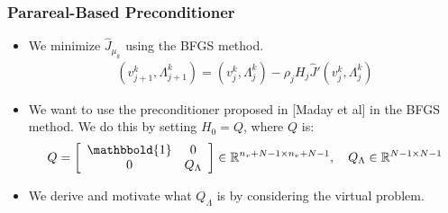 \documentclass[9pt]{beamer}
\begin{document}
\begin{frame}
\frametitle{Parareal-Based Preconditioner}
\begin{itemize}
\item{We minimize $\hat J_{\mu_k}$ using the BFGS method. {\small
\begin{align*}
(v_{j+1}^{k},\Lambda_{j+1}^{k}) = (v_j^k,\Lambda_j^k) - \rho_jH_j \hat J'(v_j^k,\Lambda_j^k)
\end{align*}}}
\item{We want to use the preconditioner proposed in [Maday et al] in the BFGS method. We do this by setting $H_0=Q$, where $Q$ is: {\small
\begin{align*}
Q = \left[ \begin{array}{cc}
	\mathbbold{1} & 0 \\
	0 & Q_{\Lambda} \\
	\end{array} \right]\in \mathbb{R}^{n_v+N-1\times n_v+N-1},\quad Q_{\Lambda}\in\mathbb{R}^{N-1\times N-1}
\end{align*}}}
\item{We derive and motivate what $Q_{\Lambda}$ is by considering the virtual problem.}
\end{itemize}
\end{frame}
\end{document}
